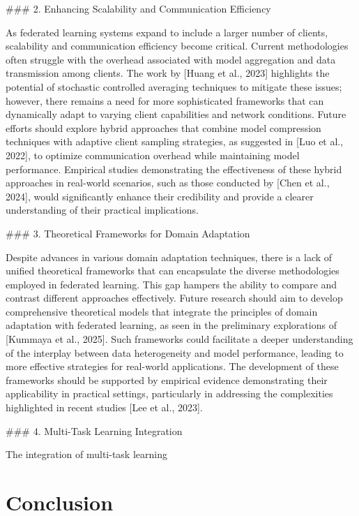 \documentclass[journal]{IEEEtran}
\begin{document}
\#\#\# 2. Enhancing Scalability and Communication Efficiency

As federated learning systems expand to include a larger number of clients, scalability and communication efficiency become critical. Current methodologies often struggle with the overhead associated with model aggregation and data transmission among clients. The work by [Huang et al., 2023] highlights the potential of stochastic controlled averaging techniques to mitigate these issues; however, there remains a need for more sophisticated frameworks that can dynamically adapt to varying client capabilities and network conditions. Future efforts should explore hybrid approaches that combine model compression techniques with adaptive client sampling strategies, as suggested in [Luo et al., 2022], to optimize communication overhead while maintaining model performance. Empirical studies demonstrating the effectiveness of these hybrid approaches in real-world scenarios, such as those conducted by [Chen et al., 2024], would significantly enhance their credibility and provide a clearer understanding of their practical implications.

\#\#\# 3. Theoretical Frameworks for Domain Adaptation

Despite advances in various domain adaptation techniques, there is a lack of unified theoretical frameworks that can encapsulate the diverse methodologies employed in federated learning. This gap hampers the ability to compare and contrast different approaches effectively. Future research should aim to develop comprehensive theoretical models that integrate the principles of domain adaptation with federated learning, as seen in the preliminary explorations of [Kummaya et al., 2025]. Such frameworks could facilitate a deeper understanding of the interplay between data heterogeneity and model performance, leading to more effective strategies for real-world applications. The development of these frameworks should be supported by empirical evidence demonstrating their applicability in practical settings, particularly in addressing the complexities highlighted in recent studies [Lee et al., 2023].

\#\#\# 4. Multi-Task Learning Integration

The integration of multi-task learning

\section{Conclusion}
\label{sec:conclusion}
\end{document}
